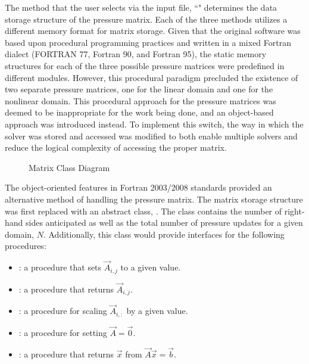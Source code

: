 The method that the user selects via the \cobra{} input file, ``" determines the data storage structure of the pressure matrix.
Each of the three methods utilizes a different memory format for matrix storage.
Given that the original software was based upon procedural programming practices and written in a mixed Fortran dialect (FORTRAN 77, Fortran 90, and Fortran 95), the static memory structures for each of the three possible pressure matrices were predefined in different modules.
However, this procedural paradigm precluded the existence of two separate pressure matrices, one for the linear domain and one for the nonlinear domain.
This procedural approach for the pressure matrices was deemed to be inappropriate for the work being done, and an object-based approach was introduced instead.
To implement this switch, the way in which the solver was stored and accessed was modified to both enable multiple solvers and reduce the logical complexity of accessing the proper matrix.

\begin{figure}[ht!]
\singlespace\centering

\caption{Matrix Class Diagram}
\label{fig:matrixClassDiagram}
\end{figure}

The object-oriented features in Fortran 2003/2008 standards provided an alternative method of handling the pressure matrix.
The matrix storage structure was first replaced with an abstract class, .
The  class contains the number of right-hand sides anticipated as well as the total number of pressure updates for a given domain, $N$.
Additionally, this class would provide interfaces for the following procedures:

\begin{itemize}
\item{ : a procedure that sets $\vec{A}_{i,j}$ to a given value.}
\item{ : a procedure that returns $\vec{A}_{i,j}$.}
\item{ : a procedure for scaling $\vec{A}_{i, :}$ by a given value.}
\item{ : a procedure for setting $\vec{A} = \vec{0}$.}
\item{ : a procedure that returns $\vec{x}$ from $\vec{A}\vec{x} = \vec{b}$.}
\end{itemize}


